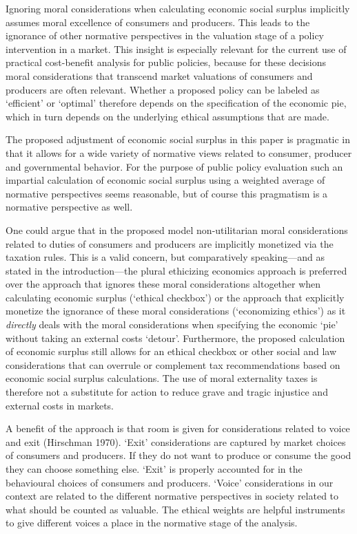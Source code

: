 \documentclass[
]{book}
\begin{document}
Ignoring moral considerations when calculating economic social surplus implicitly assumes moral excellence of consumers and producers. This leads to the ignorance of other normative perspectives in the valuation stage of a policy intervention in a market. This insight is especially relevant for the current use of practical cost-benefit analysis for public policies, because for these decisions moral considerations that transcend market valuations of consumers and producers are often relevant. Whether a proposed policy can be labeled as `efficient' or `optimal' therefore depends on the specification of the economic pie, which in turn depends on the underlying ethical assumptions that are made.

The proposed adjustment of economic social surplus in this paper is pragmatic in that it allows for a wide variety of normative views related to consumer, producer and governmental behavior. For the purpose of public policy evaluation such an impartial calculation of economic social surplus using a weighted average of normative perspectives seems reasonable, but of course this pragmatism is a normative perspective as well.

One could argue that in the proposed model non-utilitarian moral considerations related to duties of consumers and producers are implicitly monetized via the taxation rules. This is a valid concern, but comparatively speaking---and as stated in the introduction---the plural ethicizing economics approach is preferred over the approach that ignores these moral considerations altogether when calculating economic surplus (`ethical checkbox') or the approach that explicitly monetize the ignorance of these moral considerations (`economizing ethics') as it \emph{directly} deals with the moral considerations when specifying the economic `pie' without taking an external costs `detour'. Furthermore, the proposed calculation of economic surplus still allows for an ethical checkbox or other social and law considerations that can overrule or complement tax recommendations based on economic social surplus calculations. The use of moral externality taxes is therefore not a substitute for action to reduce grave and tragic injustice and external costs in markets.

A benefit of the approach is that room is given for considerations related to voice and exit (Hirschman 1970). `Exit' considerations are captured by market choices of consumers and producers. If they do not want to produce or consume the good they can choose something else. `Exit' is properly accounted for in the behavioural choices of consumers and producers. `Voice' considerations in our context are related to the different normative perspectives in society related to what should be counted as valuable. The ethical weights are helpful instruments to give different voices a place in the normative stage of the analysis.
\end{document}
